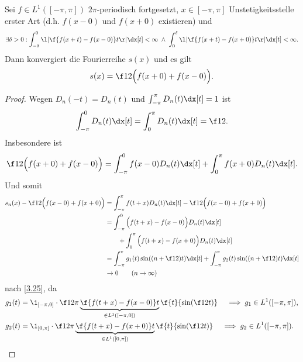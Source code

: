 \begin{st} \label{3.29}
	Sei $f \in L^1([-\pi,\pi])$ $2\pi$-periodisch fortgesetzt, $x \in [-\pi,\pi]$ Unstetigkeitsstelle erster Art (d.h. $f(x-0)$ und $f(x+0)$ existieren) und
	\[
		\exists \delta > 0 :
		\int_{-\delta}^0 \l| \f{f(x+t)-f(x-0)}t \r| \dx[t] < \infty
		\;\land\; \int_{0}^{\delta} \l| \f{f(x+t)-f(x+0)}t \r| \dx[t] < \infty.
	\]
	Dann konvergiert die Fourierreihe $s(x)$ und es gilt
	\[
		s(x) = \f 12 \Big( f(x+0) + f(x-0) \Big).
	\]
	\begin{proof}
		Wegen $D_n(-t) = D_n(t)$ und $\int_{-\pi}^\pi D_n(t) \dx[t] = 1$ ist
		\[
			\int_{-\pi}^0 D_n(t) \dx[t] = \int_0^\pi D_n(t) \dx[t] = \f 12.
		\]
		Insbesondere ist
		\[
			\f 12 \Big(f(x+0) + f(x-0) \Big) = \int_{-\pi}^0 f(x-0) D_n(t) \dx[t] + \int_{0}^\pi f(x+0) D_n(t) \dx[t].
		\]
		Und somit
		\begin{align*}
			s_n(x) - \f 12 \Big( f(x-0) + f(x+0)\Big)
			&= \int_{-\pi}^\pi f(t+x) D_n(t) \dx[t] - \f 12 \Big( f(x-0) + f(x+0)\Big) \\
			&= \int_{-\pi}^0 \Big( f(t+x) - f(x-0) \Big) D_n(t) \dx[t] \\
				&\qquad+ \int_{0}^\pi \Big( f(t+x) - f(x+0) \Big) D_n(t) \dx[t] \\
			&= \int_{-\pi}^\pi g_1(t) \sin((n+\f 12)t) \dx[t]
			+ \int_{-\pi}^\pi g_2(t) \sin((n+\f 12)t) \dx[t] \\
			&\to 0 \qquad (n\to \infty)
		\end{align*}
		nach \ref{3.25}, da
		\begin{align*}
			g_1(t) &= \1_{[-\pi,0]} \cdot \f 1{2\pi} \underbrace{\f {f(t+x) - f(x-0)}t}_{\in L^1([-\pi,0])}  \f {t}{\sin (\f 12 t)}
				\quad \implies g_1 \in L^1([-\pi,\pi]), \\
			g_2(t) &= \1_{[0,\pi]} \cdot \f 1{2\pi} \underbrace{\f {f(t+x) - f(x+0)}t}_{\in L^1([0,\pi])}  \f {t}{\sin (\f 12 t)}
				\quad \implies g_2 \in L^1([-\pi,\pi]).
		\end{align*}

	\end{proof}
\end{st}

